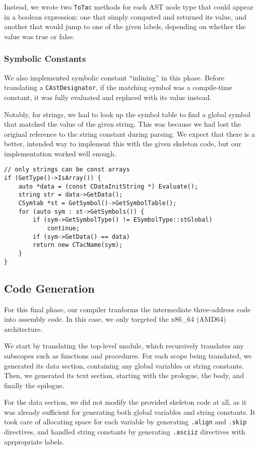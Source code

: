 \documentclass{article}
\begin{document}
Instead, we wrote two \texttt{ToTac} methods for each AST node type that could
appear in a boolean expression: one that simply computed and returned its value,
and another that would jump to one of the given labels, depending on whether the
value was true or false.

\subsubsection{Symbolic Constants}

We also implemented symbolic constant ``inlining'' in this phase. Before
translating a \texttt{CAstDesignator}, if the matching symbol was a compile-time
constant, it was fully evaluated and replaced with its value instead.

Notably, for strings, we had to look up the symbol table to find a global symbol
that matched the value of the given string. This was because we had lost the
original reference to the string constant during parsing. We expect that there
is a better, intended way to implement this with the given skeleton code, but
our implementation worked well enough.

\begin{lstlisting}
// only strings can be const arrays
if (GetType()->IsArray()) {
	auto *data = (const CDataInitString *) Evaluate();
	string str = data->GetData();
	CSymtab *st = GetSymbol()->GetSymbolTable();
	for (auto sym : st->GetSymbols()) {
		if (sym->GetSymbolType() != ESymbolType::stGlobal)
			continue;
		if (sym->GetData() == data)
		return new CTacName(sym);
	}
}
\end{lstlisting}

\subsection{Code Generation}

For this final phase, our compiler tranforms the intermediate three-address code
into assembly code. In this case, we only targeted the x86\_64 (AMD64)
architecture.

We start by translating the top-level module, which recursively translates any
subscopes such as functions and procedures. For each scope being translated, we
generated its data section, containing any global variables or string constants.
Then, we generated its text section, starting with the prologue, the body, and
finally the epilogue.

For the data section, we did not modify the provided skeleton code at all, as it
was already sufficient for generating both global variables and string
constants. It took care of allocating space for each variable by generating
\texttt{.align} and \texttt{.skip} directives, and handled string constants by
generating \texttt{.asciiz} directives with aprpropriate labels.
\end{document}
